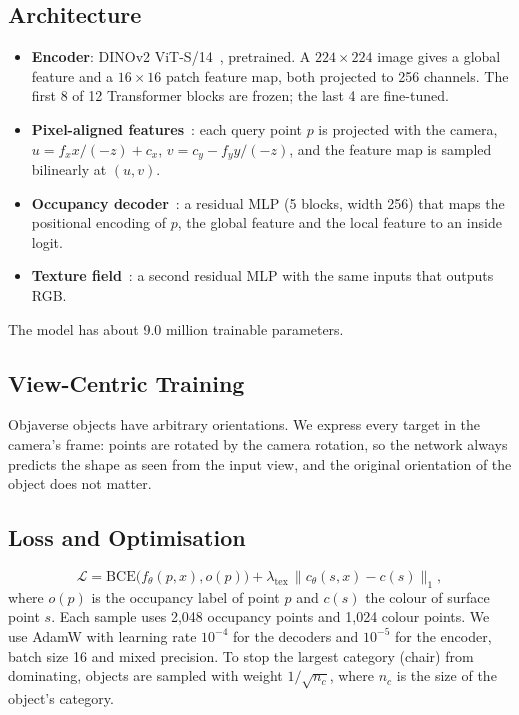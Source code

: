 \subsection{Architecture}
\begin{itemize}[leftmargin=*]
  \item \textbf{Encoder}: DINOv2 ViT-S/14~\cite{oquab2023dinov2,dosovitskiy2021vit}, pretrained. A $224\times224$ image gives a global feature and a $16\times16$ patch feature map, both projected to 256 channels. The first 8 of 12 Transformer blocks are frozen; the last 4 are fine-tuned.
  \item \textbf{Pixel-aligned features}~\cite{saito2019pifu,xu2019disn}: each query point $p$ is projected with the camera, $u = f_x x/(-z) + c_x$, $v = c_y - f_y y/(-z)$, and the feature map is sampled bilinearly at $(u,v)$.
  \item \textbf{Occupancy decoder}~\cite{mescheder2019onet}: a residual MLP (5 blocks, width 256) that maps the positional encoding of $p$, the global feature and the local feature to an inside logit.
  \item \textbf{Texture field}~\cite{oechsle2019texturefields}: a second residual MLP with the same inputs that outputs RGB.
\end{itemize}
The model has about 9.0 million trainable parameters.

\subsection{View-Centric Training}
Objaverse objects have arbitrary orientations. We express every target in the camera's frame: points are rotated by the camera rotation, so the network always predicts the shape as seen from the input view, and the original orientation of the object does not matter.

\subsection{Loss and Optimisation}
\begin{equation}
\mathcal{L} = \mathrm{BCE}\big(f_\theta(p, x), o(p)\big) + \lambda_{\text{tex}} \, \big\lVert c_\theta(s, x) - c(s) \big\rVert_1 ,
\end{equation}
where $o(p)$ is the occupancy label of point $p$ and $c(s)$ the colour of surface point $s$. Each sample uses 2{,}048 occupancy points and 1{,}024 colour points. We use AdamW with learning rate $10^{-4}$ for the decoders and $10^{-5}$ for the encoder, batch size 16 and mixed precision. To stop the largest category (chair) from dominating, objects are sampled with weight $1/\sqrt{n_c}$, where $n_c$ is the size of the object's category.

